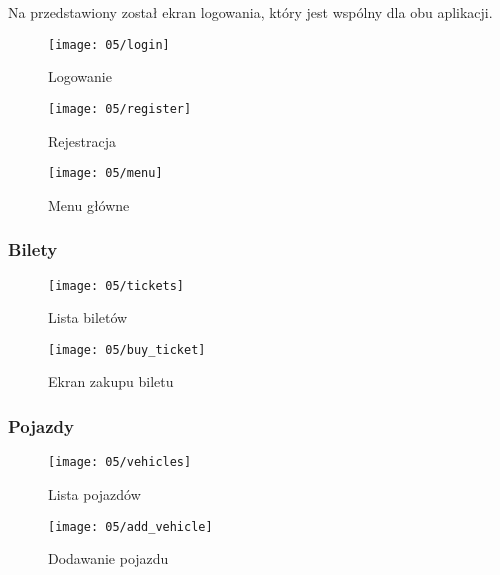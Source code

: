 Na  przedstawiony został ekran logowania, który jest wspólny dla obu aplikacji.

\begin{figure}[h]
	\centering
	\begin{minipage}[b]{0.3\textwidth}
		\texttt{[image: 05/login]}
		\caption{Logowanie}
	\end{minipage}
	\hfill
	\begin{minipage}[b]{0.3\textwidth}
		\texttt{[image: 05/register]}
		\caption{Rejestracja}
	\end{minipage}
	\hfill
	\begin{minipage}[b]{0.3\textwidth}
		\texttt{[image: 05/menu]}
		\caption{Menu główne}
	\end{minipage}
\end{figure}

\newpage

\subsubsection*{Bilety}

\begin{figure}[h]
	\centering
	\begin{minipage}[b]{0.35\textwidth}
		\texttt{[image: 05/tickets]}
		\caption{Lista biletów}
	\end{minipage}
	\hspace{3cm}
	\begin{minipage}[b]{0.35\textwidth}
		\texttt{[image: 05/buy\_ticket]}
		\caption{Ekran zakupu biletu}
	\end{minipage}
\end{figure}

\newpage

\subsubsection*{Pojazdy}

\begin{figure}[h]
	\centering
	\begin{minipage}[b]{0.35\textwidth}
		\texttt{[image: 05/vehicles]}
		\caption{Lista pojazdów}
	\end{minipage}
	\hspace{3cm}
	\begin{minipage}[b]{0.35\textwidth}
		\texttt{[image: 05/add\_vehicle]}
		\caption{Dodawanie pojazdu}
	\end{minipage}
\end{figure}

